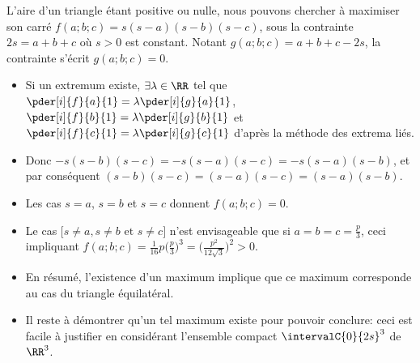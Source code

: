 \begin{remark} \label{constrained-extrema}
	L'aire d'un triangle étant positive ou nulle, nous pouvons chercher à maximiser son carré
	$f(a;b;c) = s(s - a)(s - b)(s - c)$,
	sous la contrainte $2s = a + b + c$ où $s > 0$ est constant.
	Notant $g(a;b;c) = a + b + c - 2 s$, la contrainte s'écrit $g(a;b;c) = 0$.
	\begin{itemize}
		\item Si un extremum existe,
    	$\exists \lambda \in \RR$ tel que
    	$\pder[i]{f}{a}{1} = \lambda \pder[i]{g}{a}{1}$,
    	$\pder[i]{f}{b}{1} = \lambda \pder[i]{g}{b}{1}$ et
    	$\pder[i]{f}{c}{1} = \lambda \pder[i]{g}{c}{1}$
		d'après la méthode des extrema liés.

		\item Donc
		$- s(s - b)(s - c) = - s(s - a)(s - c) = - s(s - a)(s - b)$,
		et par conséquent
		$(s - b)(s - c) = (s - a)(s - c) = (s - a)(s - b)$.

		\item Les cas $s = a$, $s = b$ et $s = c$ donnent $f(a;b;c) = 0$.

		\item Le cas $\big[ s \neq a, s \neq b \text{ et } s \neq c \big]$ n'est envisageable que si $a = b = c = \frac{p}{3}$, ceci impliquant $f(a;b;c) = \frac{1}{16} p \big( \frac{p}{3} \big)^3 = \big( \frac{p^2}{12 \sqrt{3}} \big)^2 > 0$.

		\item En résumé, l'existence d'un maximum implique que ce maximum corresponde au cas du triangle équilatéral.

		\item Il reste à démontrer qu'un tel maximum existe pour pouvoir conclure: ceci est facile à justifier en considérant l'ensemble compact $\intervalC{0}{2s}^3$ de $\RR^3$.
	\end{itemize}
\end{remark}
